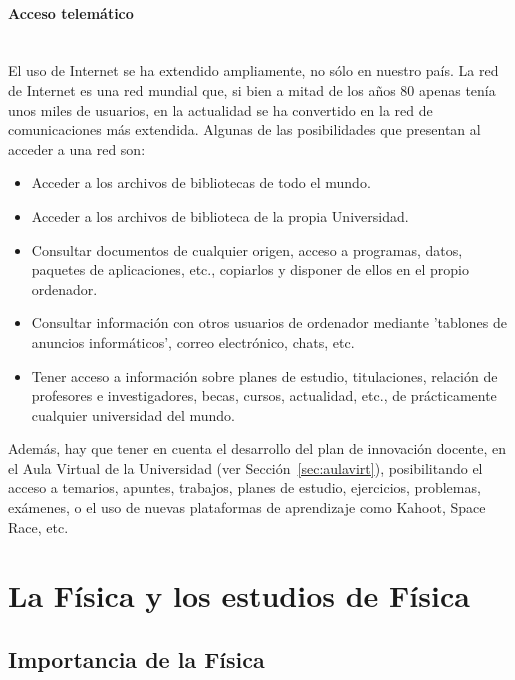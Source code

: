\paragraph{Acceso telemático\\\\}

El uso de Internet se ha extendido ampliamente, no sólo en nuestro país. La red de Internet es una red mundial que, si bien a mitad de los años 80 apenas tenía unos miles de usuarios, en la actualidad se ha convertido en la red de comunicaciones más extendida. Algunas de las posibilidades que presentan al acceder a una red son:

\begin{itemize}
\item	Acceder a los archivos de bibliotecas de todo el mundo.
\item	Acceder a los archivos de biblioteca de la propia Universidad.
\item	Consultar documentos de cualquier origen, acceso a programas, datos, paquetes de aplicaciones, etc., copiarlos y disponer de ellos en el propio ordenador.
\item	Consultar información con otros usuarios de ordenador mediante 'tablones de anuncios informáticos', correo electrónico, chats, etc.
\item	Tener acceso a información sobre planes de estudio, titulaciones, relación de profesores e investigadores, becas, cursos, actualidad, etc., de prácticamente cualquier universidad del mundo.
\end{itemize}

Además, hay que tener en cuenta el desarrollo del plan de innovación docente, en el Aula Virtual de la Universidad (ver Sección~\ref{sec:aulavirt}), posibilitando el acceso a temarios, apuntes, trabajos, planes de estudio, ejercicios, problemas, exámenes, o el uso de nuevas plataformas de aprendizaje como Kahoot, Space Race, etc.


\section{La Física y los estudios de Física} \label{sec:fisica}

\subsection{Importancia de la Física}


